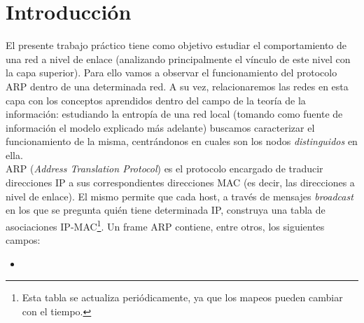 \section{Introducci\'on}


El presente trabajo pr\'actico tiene como objetivo estudiar el comportamiento de una red a nivel de enlace (analizando principalmente el v\'inculo de este nivel con la capa superior). Para ello vamos a observar el funcionamiento del protocolo ARP dentro de una determinada red. A su vez, relacionaremos las redes en esta capa con los conceptos aprendidos dentro del campo de la teor\'ia de la informaci\'on: estudiando la entrop\'ia de una red local (tomando como fuente de informaci\'on el modelo explicado m\'as adelante) buscamos caracterizar el funcionamiento de la misma, centr\'andonos en cuales son los nodos \emph{distinguidos} en ella.\\

ARP (\emph{Address Translation Protocol}) es el protocolo encargado de traducir direcciones IP a sus correspondientes direcciones MAC (es decir, las direcciones a nivel de enlace). El mismo permite que cada host, a trav\'es de mensajes \emph{broadcast} en los que se pregunta qui\'en tiene determinada IP, construya una tabla de asociaciones IP-MAC\footnote{Esta tabla se actualiza peri\'odicamente, ya que los mapeos pueden cambiar con el tiempo.}. Un frame ARP contiene, entre otros, los siguientes campos:

\begin{itemize}
 \item 
\end{itemize}
